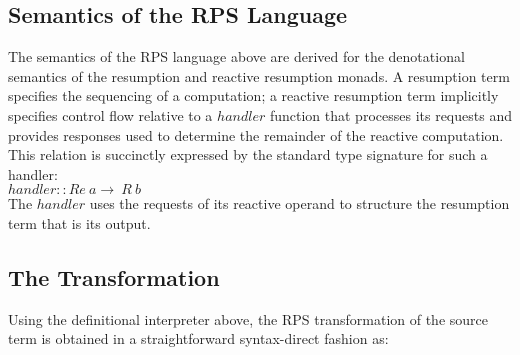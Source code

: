 \documentclass[a4paper,10pt]{article}
\begin{document}
\subsection{Semantics of the RPS Language}

The semantics of the RPS language above are derived for the denotational semantics of the resumption and reactive resumption monads.  A resumption term specifies the sequencing of a computation; a reactive resumption term implicitly specifies control flow relative to a $handler$ function that processes its requests and provides responses used to determine the remainder of the reactive computation.  This relation is succinctly expressed by the standard type signature for such a handler:\\

$handler :: Re\ a \longrightarrow \ R\ b$\\

The $handler$ uses the requests of its reactive operand to structure the resumption term that is its output.


\subsection{The Transformation}

Using the definitional interpreter above, the RPS transformation of the source term is obtained in a straightforward syntax-direct fashion as:\\
\end{document}
